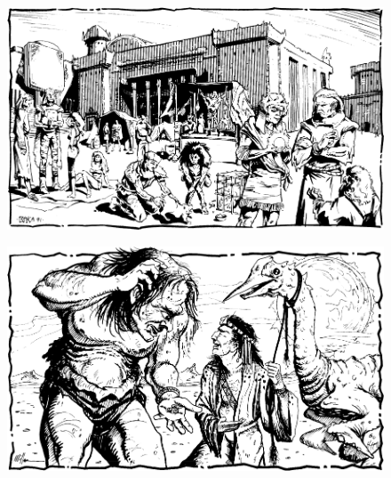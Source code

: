 
\begin{figure}[t!]
\centering
\includegraphics[width=\textwidth]{images/market-1.png}
\WOTC
\end{figure}





\begin{figure}[b!]
\centering
\includegraphics[width=\textwidth]{images/merchant-3.png}
\WOTC
\end{figure}






